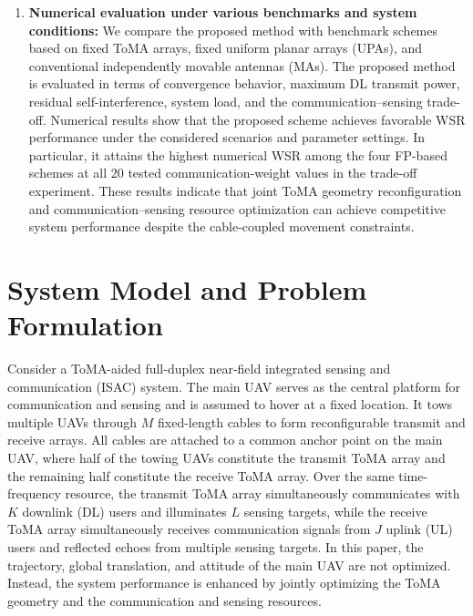 \documentclass[letterpaper,journal]{IEEEtran}
\begin{document}
\begin{enumerate}
    \item \textbf{Numerical evaluation under various benchmarks and system conditions:}
    We compare the proposed method with benchmark schemes based on fixed ToMA arrays, fixed uniform planar arrays (UPAs), and conventional independently movable antennas (MAs). The proposed method is evaluated in terms of convergence behavior, maximum DL transmit power, residual self-interference, system load, and the communication--sensing trade-off. Numerical results show that the proposed scheme achieves favorable WSR performance under the considered scenarios and parameter settings. In particular, it attains the highest numerical WSR among the four FP-based schemes at all 20 tested communication-weight values in the trade-off experiment. These results indicate that joint ToMA geometry reconfiguration and communication--sensing resource optimization can achieve competitive system performance despite the cable-coupled movement constraints.
\end{enumerate}

\section{System Model and Problem Formulation}
\label{sec:system_model}

Consider a ToMA-aided full-duplex near-field integrated sensing and communication (ISAC) system. The main UAV serves as the central platform for communication and sensing and is assumed to hover at a fixed location. It tows multiple UAVs through $M$ fixed-length cables to form reconfigurable transmit and receive arrays. All cables are attached to a common anchor point on the main UAV, where half of the towing UAVs constitute the transmit ToMA array and the remaining half constitute the receive ToMA array. Over the same time-frequency resource, the transmit ToMA array simultaneously communicates with $K$ downlink (DL) users and illuminates $L$ sensing targets, while the receive ToMA array simultaneously receives communication signals from $J$ uplink (UL) users and reflected echoes from multiple sensing targets. In this paper, the trajectory, global translation, and attitude of the main UAV are not optimized. Instead, the system performance is enhanced by jointly optimizing the ToMA geometry and the communication and sensing resources.
\end{document}
